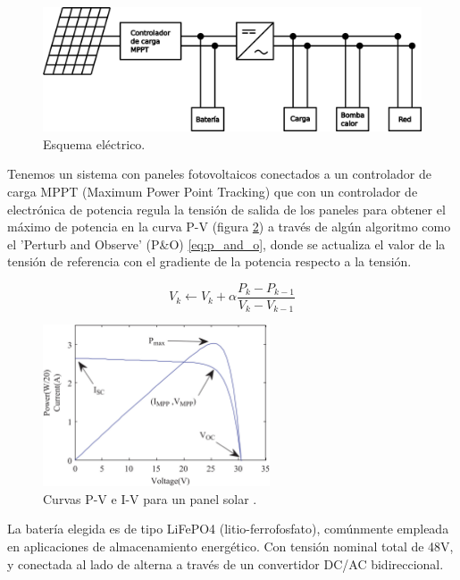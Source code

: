 \begin{figure}[h] \centering
	\centering
	\includegraphics[width=1\textwidth]{./capitulos/resultados_discusion/images/diagrama_electrico.png}
	\caption{Esquema eléctrico.}
	\label{fig:electric_diagram}
\end{figure}

Tenemos un sistema con paneles fotovoltaicos conectados a un controlador de
carga MPPT (Maximum Power Point Tracking) que con un controlador de electrónica
de potencia regula la tensión de salida de los paneles para obtener el máximo
de potencia en la curva P-V (figura \ref{fig:solar_P-V_I-V}) a través de algún
algoritmo como el 'Perturb and Observe' (P\&O) \eqref{eq:p_and_o}, donde se actualiza el valor de
la tensión de referencia con el gradiente de la potencia respecto a la tensión.

\begin{equation} \label{eq:p_and_o}
	V_{k} \leftarrow V_k + \alpha \frac{P_k - P_{k-1}}{V_{k}-V_{k-1}}
\end{equation}

\begin{figure}[h] \centering
	\centering
	\includegraphics[width=0.6\textwidth]{./capitulos/resultados_discusion/images/solar_P-V_I-V.jpg}
	\caption{Curvas P-V e I-V para un panel solar \cite{podder2019mppt}.}
	\label{fig:solar_P-V_I-V}
\end{figure}


La batería elegida es de tipo LiFePO4 (litio-ferrofosfato), comúnmente
empleada en aplicaciones de almacenamiento energético. Con tensión nominal
total de 48V, y conectada al lado de alterna a través de un convertidor
DC/AC bidireccional.

